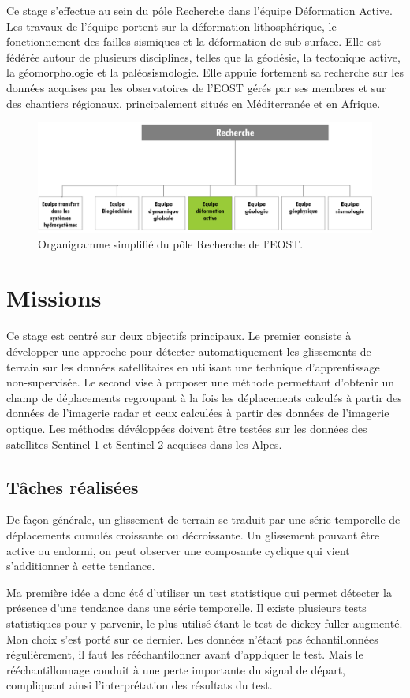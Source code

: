 \documentclass[11pt, openany]{report}
\begin{document}
Ce stage s'effectue au sein du pôle Recherche dans l'équipe Déformation Active. Les travaux de l'équipe portent sur la déformation lithosphérique, le fonctionnement des failles sismiques et la déformation de sub-surface. Elle est fédérée autour de plusieurs disciplines, telles que la géodésie, la tectonique active, la géomorphologie et la paléosismologie. Elle appuie fortement sa recherche sur les données acquises par les observatoires de l'EOST gérés par ses membres et sur des chantiers régionaux, principalement situés en Méditerranée et en Afrique.

\begin{figure}[H]
  \centering
  \includegraphics[width=0.6\linewidth]{recherche.png}
  \caption{Organigramme simplifié du pôle Recherche de l'EOST.}
\end{figure}

\chapter{Missions}
Ce stage est centré sur deux objectifs principaux. Le premier consiste à développer une approche pour détecter automatiquement les glissements de terrain sur les données satellitaires en utilisant une technique d'apprentissage non-supervisée. Le second vise à proposer une méthode permettant d'obtenir un champ de déplacements regroupant à la fois les déplacements calculés à partir des données de l'imagerie radar et ceux  calculées à partir des données de l'imagerie optique. Les méthodes dévéloppées doivent être testées sur les données des satellites Sentinel-1 et Sentinel-2 acquises dans les Alpes.
\section{Tâches réalisées}
De façon générale, un glissement de terrain se traduit par une série temporelle de déplacements cumulés croissante ou décroissante. Un glissement pouvant être active ou endormi, on peut observer une composante cyclique qui vient s'additionner à cette tendance.

Ma première idée a donc été d'utiliser un test statistique qui permet détecter la présence d'une tendance dans une série temporelle. Il existe plusieurs tests statistiques pour y parvenir, le plus utilisé étant le test de dickey fuller augmenté. Mon choix s'est porté sur ce dernier. Les données n'étant pas échantillonnées régulièrement, il faut les rééchantilonner avant d'appliquer le test. Mais le rééchantillonnage conduit à une perte importante du signal de départ, compliquant ainsi l'interprétation des résultats du test. 
\end{document}
